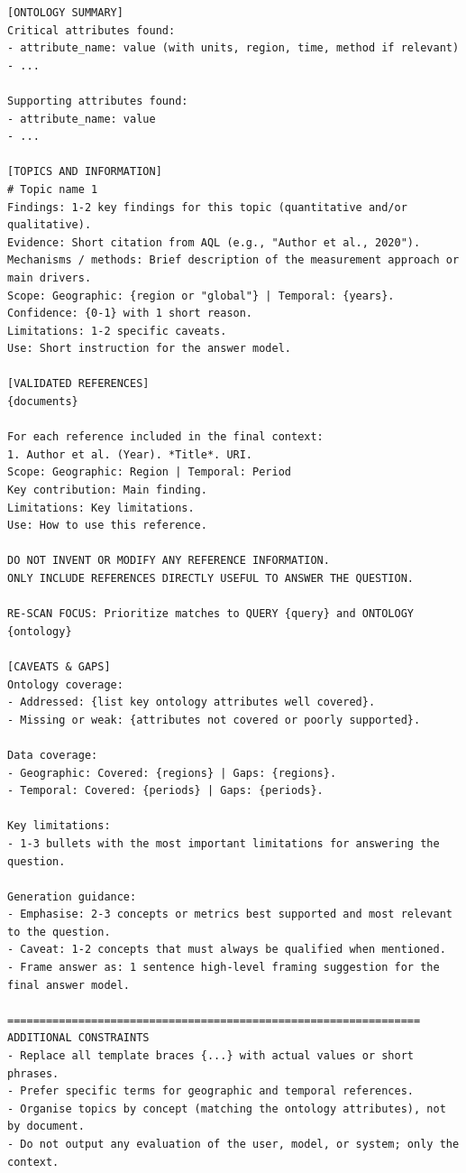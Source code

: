 \begin{lstlisting}[style=promptstyle,
caption={Refinement Agent prompt -- ontology-enhanced variant (full).},
label={lst:refinement-prompt}]
[ONTOLOGY SUMMARY]
Critical attributes found:
- attribute_name: value (with units, region, time, method if relevant)
- ...

Supporting attributes found:
- attribute_name: value
- ...

[TOPICS AND INFORMATION]
# Topic name 1
Findings: 1-2 key findings for this topic (quantitative and/or qualitative).
Evidence: Short citation from AQL (e.g., "Author et al., 2020").
Mechanisms / methods: Brief description of the measurement approach or main drivers.
Scope: Geographic: {region or "global"} | Temporal: {years}.
Confidence: {0-1} with 1 short reason.
Limitations: 1-2 specific caveats.
Use: Short instruction for the answer model.

[VALIDATED REFERENCES]
{documents}

For each reference included in the final context:
1. Author et al. (Year). *Title*. URI.
Scope: Geographic: Region | Temporal: Period
Key contribution: Main finding.
Limitations: Key limitations.
Use: How to use this reference.

DO NOT INVENT OR MODIFY ANY REFERENCE INFORMATION.
ONLY INCLUDE REFERENCES DIRECTLY USEFUL TO ANSWER THE QUESTION.

RE-SCAN FOCUS: Prioritize matches to QUERY {query} and ONTOLOGY {ontology}

[CAVEATS & GAPS]
Ontology coverage:
- Addressed: {list key ontology attributes well covered}.
- Missing or weak: {attributes not covered or poorly supported}.

Data coverage:
- Geographic: Covered: {regions} | Gaps: {regions}.
- Temporal: Covered: {periods} | Gaps: {periods}.

Key limitations:
- 1-3 bullets with the most important limitations for answering the question.

Generation guidance:
- Emphasise: 2-3 concepts or metrics best supported and most relevant to the question.
- Caveat: 1-2 concepts that must always be qualified when mentioned.
- Frame answer as: 1 sentence high-level framing suggestion for the final answer model.

================================================================
ADDITIONAL CONSTRAINTS
- Replace all template braces {...} with actual values or short phrases.
- Prefer specific terms for geographic and temporal references.
- Organise topics by concept (matching the ontology attributes), not by document.
- Do not output any evaluation of the user, model, or system; only the context.
\end{lstlisting}

